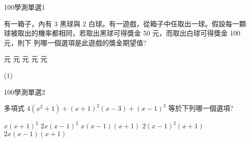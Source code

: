 \begin{QUESTIONS}
    \begin{QUESTION}
        \begin{ExamInfo}{100}{學測}{單選}{1}
        \end{ExamInfo}
        \begin{ExamAnsRateInfo}{85}{99}{98}{58}
        \end{ExamAnsRateInfo}
        \begin{QBODY}
			有一箱子，內有 3 黑球與 2 白球。有一遊戲，從箱子中任取出一球。假設每一顆球被取出的機率都相同，若取出黑球可得獎金 50 元，而取出白球可得獎金 100 元，則下 列哪一個選項是此遊戲的獎金期望值?
			\begin{QOPS} 
				 元
				 元 
				 元 
				 元 
				 元
			\end{QOPS}
        \end{QBODY}
        \begin{QFROMS}
        \end{QFROMS}
        \begin{QTAGS}\end{QTAGS}
        \begin{QANS}
            (1)
        \end{QANS}
        \begin{QSOLLIST}
        \end{QSOLLIST}
        \begin{QEMPTYSPACE}
        \end{QEMPTYSPACE}
    \end{QUESTION}
    \begin{QUESTION}
        \begin{ExamInfo}{100}{學測}{單選}{2}
        \end{ExamInfo}
        \begin{ExamAnsRateInfo}{72}{92}{82}{42}
        \end{ExamAnsRateInfo}
        \begin{QBODY}
			多項式 $4(x^2 +1)+(x+1)^2(x-3)+(x-1)^3$ 等於下列哪一個選項? 
			\begin{QOPS} 
				\QOP $x(x+1)^2$ 
				\QOP $2x(x-1)^2$
				\QOP $x(x-1)(x+1)$    
				\QOP  $2(x-1)^2(x+1)$    
				\QOP $2x(x-1)(x+1)$
			\end{QOPS}
        \end{QBODY}
        \begin{QFROMS}
        \end{QFROMS}

\end{QUESTION}
\end{QUESTIONS}
